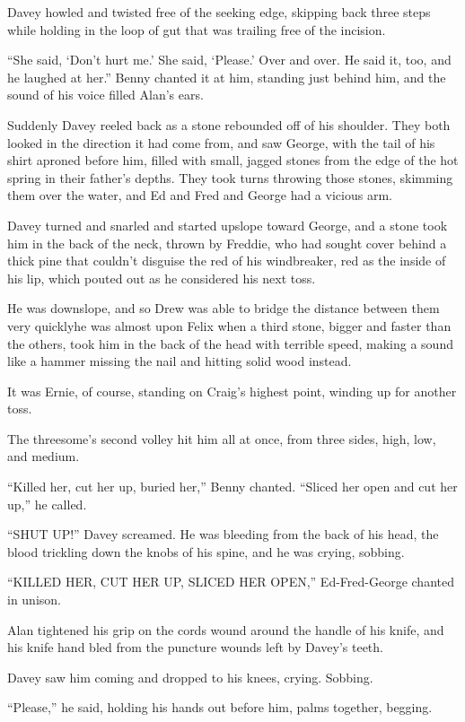 Davey howled and twisted free of the seeking edge, skipping back three
steps while holding in the loop of gut that was trailing free of the
incision.

``She said, `Don't hurt me.' She said, `Please.' Over and over.  He
said it, too, and he laughed at her.'' Benny chanted it at him,
standing just behind him, and the sound of his voice filled Alan's
ears.

Suddenly Davey reeled back as a stone rebounded off of his shoulder. 
They both looked in the direction it had come from, and saw George,
with the tail of his shirt aproned before him, filled with small,
jagged stones from the edge of the hot spring in their father's
depths.  They took turns throwing those stones, skimming them over the
water, and Ed and Fred and George had a vicious arm.

Davey turned and snarled and started upslope toward George, and a
stone took him in the back of the neck, thrown by Freddie, who had
sought cover behind a thick pine that couldn't disguise the red of his
windbreaker, red as the inside of his lip, which pouted out as he
considered his next toss.

He was downslope, and so Drew was able to bridge the distance between
them very quickly\dash{}he was almost upon Felix when a third stone,
bigger and faster than the others, took him in the back of the head
with terrible speed, making a sound like a hammer missing the nail and
hitting solid wood instead.

It was Ernie, of course, standing on Craig's highest point, winding up
for another toss.

The threesome's second volley hit him all at once, from three sides,
high, low, and medium.

``Killed her, cut her up, buried her,'' Benny chanted.  ``Sliced her
open and cut her up,'' he called.

``SHUT UP!'' Davey screamed.  He was bleeding from the back of his
head, the blood trickling down the knobs of his spine, and he was
crying, sobbing.

``KILLED HER, CUT HER UP, SLICED HER OPEN,'' Ed-Fred-George chanted in
unison.

Alan tightened his grip on the cords wound around the handle of his
knife, and his knife hand bled from the puncture wounds left by
Davey's teeth.

Davey saw him coming and dropped to his knees, crying.  Sobbing.

``Please,'' he said, holding his hands out before him, palms together,
begging.

